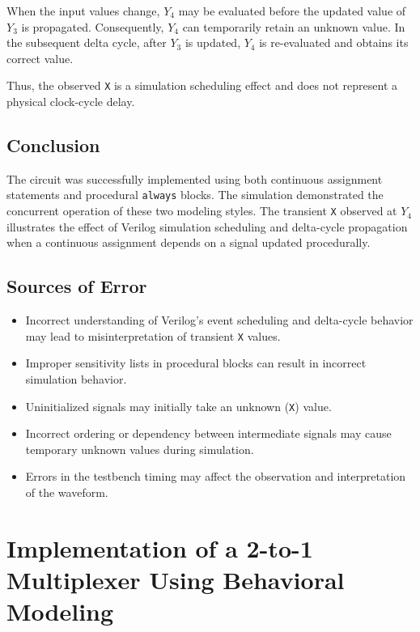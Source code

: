 \documentclass[12pt,a4paper]{report}
\begin{document}
When the input values change, $Y_4$ may be evaluated before the updated value of $Y_3$ is propagated. Consequently, $Y_4$ can temporarily retain an unknown value. In the subsequent delta cycle, after $Y_3$ is updated, $Y_4$ is re-evaluated and obtains its correct value.

Thus, the observed \texttt{X} is a simulation scheduling effect and does not represent a physical clock-cycle delay.

\section{Conclusion}

The circuit was successfully implemented using both continuous assignment statements and procedural \texttt{always} blocks. The simulation demonstrated the concurrent operation of these two modeling styles. The transient \texttt{X} observed at $Y_4$ illustrates the effect of Verilog simulation scheduling and delta-cycle propagation when a continuous assignment depends on a signal updated procedurally.

\section{Sources of Error}

\begin{itemize}
    \item Incorrect understanding of Verilog's event scheduling and delta-cycle behavior may lead to misinterpretation of transient \texttt{X} values.
    \item Improper sensitivity lists in procedural blocks can result in incorrect simulation behavior.
    \item Uninitialized signals may initially take an unknown (\texttt{X}) value.
    \item Incorrect ordering or dependency between intermediate signals may cause temporary unknown values during simulation.
    \item Errors in the testbench timing may affect the observation and interpretation of the waveform.
\end{itemize}

\vspace{2.5cm}

\chapter{Implementation of a 2-to-1 Multiplexer Using Behavioral Modeling}
\label{ch:pdf10}
\end{document}
